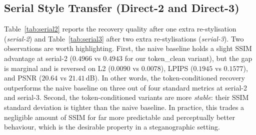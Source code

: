 \documentclass[conference]{IEEEtran}
\begin{document}
\subsection{Serial Style Transfer (Direct-2 and Direct-3)}
\label{sec:exp_serial}
Table~\ref{tab:serial2} reports the recovery quality after one extra re-stylisation (\emph{serial-2}) and Table~\ref{tab:serial3} after two extra re-stylisations (\emph{serial-3}). Two observations are worth highlighting. First, the naive baseline holds a slight SSIM advantage at serial-2 ($0.4966$ vs $0.4943$ for our token\_clean variant), but the gap is marginal and is reversed on L2 ($0.0090$ vs $0.0078$), LPIPS ($0.1945$ vs $0.1577$), and PSNR ($20.64$ vs $21.41$\,dB). In other words, the token-conditioned recovery outperforms the naive baseline on three out of four standard metrics at serial-2 and serial-3. Second, the token-conditioned variants are more \emph{stable}: their SSIM standard deviation is tighter than the naive baseline. In practice, this trades a negligible amount of SSIM for far more predictable and perceptually better behaviour, which is the desirable property in a steganographic setting.

\begin{table}[t]
\centering
\caption{Two-step serial style transfer (serial-2, $600$ pairs). ``blend'' rows are the proposed model using the blended serial-source; ``render'' rows additionally re-render through $f_{\text{style}}$ at test time. All token rows correspond to our reverse decoder.}
\label{tab:serial2}
\setlength{\tabcolsep}{2.5pt}
\end{table}
\end{document}
